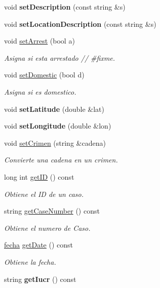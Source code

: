 \begin{DoxyCompactItemize}
\item 
\hypertarget{classcrimen_a49fdeeb1b6376fd78bce80e42f670d43}{}void {\bfseries set\+Description} (const string \&s)\label{classcrimen_a49fdeeb1b6376fd78bce80e42f670d43}

\item 
\hypertarget{classcrimen_ad3bd97ed5867e3961a77f64a15797e41}{}void {\bfseries set\+Location\+Description} (const string \&s)\label{classcrimen_ad3bd97ed5867e3961a77f64a15797e41}

\item 
void \hyperlink{classcrimen_ae08b85470038469179a01ba753b7641a}{set\+Arrest} (bool a)
\begin{DoxyCompactList}\small\item\em Asigna si esta arrestado // \#fixme. \end{DoxyCompactList}\item 
void \hyperlink{classcrimen_a3ec14cf4bb0464350d8efd98d2679d41}{set\+Domestic} (bool d)
\begin{DoxyCompactList}\small\item\em Asigna si es domestico. \end{DoxyCompactList}\item 
\hypertarget{classcrimen_a10b0917bbef15352657a1ccdbee1a738}{}void {\bfseries set\+Latitude} (double \&lat)\label{classcrimen_a10b0917bbef15352657a1ccdbee1a738}

\item 
\hypertarget{classcrimen_a8db952f20e2fb3ab6a9124f0a6dcf0a4}{}void {\bfseries set\+Longitude} (double \&lon)\label{classcrimen_a8db952f20e2fb3ab6a9124f0a6dcf0a4}

\item 
void \hyperlink{classcrimen_a24c7850a61d6435929450b7b10964f07}{set\+Crimen} (string \&cadena)
\begin{DoxyCompactList}\small\item\em Convierte una cadena en un crimen. \end{DoxyCompactList}\item 
long int \hyperlink{classcrimen_a855eab30a304a6498828cb5d85a4e0e3}{get\+I\+D} () const 
\begin{DoxyCompactList}\small\item\em Obtiene el I\+D de un caso. \end{DoxyCompactList}\item 
string \hyperlink{classcrimen_ab3c025eb20cdcea9192ee190fa2af015}{get\+Case\+Number} () const 
\begin{DoxyCompactList}\small\item\em Obtiene el numero de Caso. \end{DoxyCompactList}\item 
\hyperlink{classfecha}{fecha} \hyperlink{classcrimen_a8a6712e536211034819441ab87e1c215}{get\+Date} () const 
\begin{DoxyCompactList}\small\item\em Obtiene la fecha. \end{DoxyCompactList}\item 
\hypertarget{classcrimen_a6d2bac20ef41f8c9944ca7deb8cc2ed5}{}string {\bfseries get\+Iucr} () const \label{classcrimen_a6d2bac20ef41f8c9944ca7deb8cc2ed5}


\end{DoxyCompactItemize}
